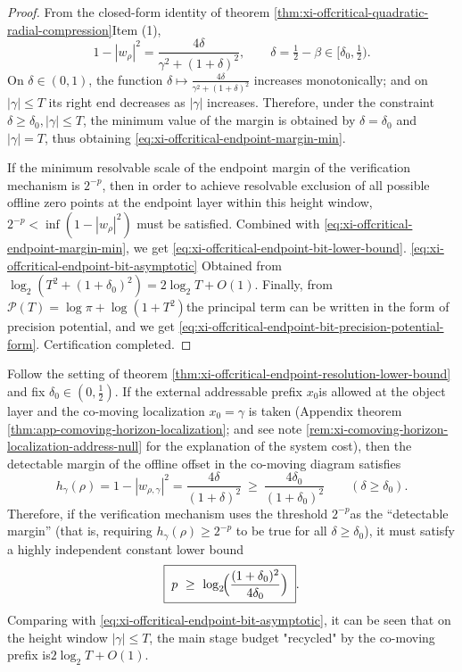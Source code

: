 \begin{proof}
From the closed-form identity of theorem \ref{thm:xi-offcritical-quadratic-radial-compression} ​​Item (1),
\[
1-|w_\rho|^2=\frac{4\delta}{\gamma^2+(1+\delta)^2},
\qquad \delta=\tfrac12-\beta\in[\delta_0,\tfrac12).
\]
On \(\delta\in(0,1)\), the function \(\delta\mapsto \frac{4\delta}{\gamma^2+(1+\delta)^2}\) increases monotonically; and on \(|\gamma|\le T\) its right end decreases as \(|\gamma|\) increases.
Therefore, under the constraint \(\delta\ge\delta_0,|\gamma|\le T\), the minimum value of the margin is obtained by \(\delta=\delta_0\) and \(|\gamma|=T\), thus obtaining \eqref{eq:xi-offcritical-endpoint-margin-min}.
\par
If the minimum resolvable scale of the endpoint margin of the verification mechanism is \(2^{-p}\), then in order to achieve resolvable exclusion of all possible offline zero points at the endpoint layer within this height window, \(2^{-p}<\inf(1-|w_\rho|^2)\) must be satisfied. Combined with \eqref{eq:xi-offcritical-endpoint-margin-min}, we get \eqref{eq:xi-offcritical-endpoint-bit-lower-bound}.
\eqref{eq:xi-offcritical-endpoint-bit-asymptotic} Obtained from \(\log_2(T^2+(1+\delta_0)^2)=2\log_2 T+O(1)\).
Finally, from \(\mathcal{P}(T)=\log\pi+\log(1+T^2)\) ​​the principal term can be written in the form of precision potential, and we get \eqref{eq:xi-offcritical-endpoint-bit-precision-potential-form}. Certification completed.
\end{proof}

\begin{corollary}[Bit budget revenue law of co-moving prefix: secondary compression \texorpdfstring{$\Rightarrow$}{=>} constant budget]\label{cor:xi-comoving-prefix-bit-budget-gain}
Follow the setting of theorem \ref{thm:xi-offcritical-endpoint-resolution-lower-bound} and fix \(\delta_0\in(0,\tfrac12)\).
If the external addressable prefix \(x_0\) ​​is allowed at the object layer and the co-moving localization \(x_0=\gamma\) is taken (Appendix theorem \ref{thm:app-comoving-horizon-localization}; and see note \ref{rem:xi-comoving-horizon-localization-address-null} for the explanation of the system cost), then the detectable margin of the offline offset in the co-moving diagram satisfies
\[
h_{\gamma}(\rho)=1-|w_{\rho,\gamma}|^2=\frac{4\delta}{(1+\delta)^2}\ \ge\ \frac{4\delta_0}{(1+\delta_0)^2}\qquad(\delta\ge\delta_0).
\]
Therefore, if the verification mechanism uses the threshold \(2^{-p}\) ​​as the “detectable margin” (that is, requiring \(h_{\gamma}(\rho)\ge 2^{-p}\) to be true for all \(\delta\ge\delta_0\)), it must satisfy a highly independent constant lower bound
\begin{equation}\label{eq:xi-comoving-bit-threshold}
\boxed{\;
p\ \ge\ \log_2\!\Bigl(\frac{(1+\delta_0)^2}{4\delta_0}\Bigr)\; }.
\end{equation}
Comparing with \eqref{eq:xi-offcritical-endpoint-bit-asymptotic}, it can be seen that on the height window \(|\gamma|\le T\), the main stage budget "recycled" by the co-moving prefix is ​​\(2\log_2T+O(1)\).
\end{corollary}

